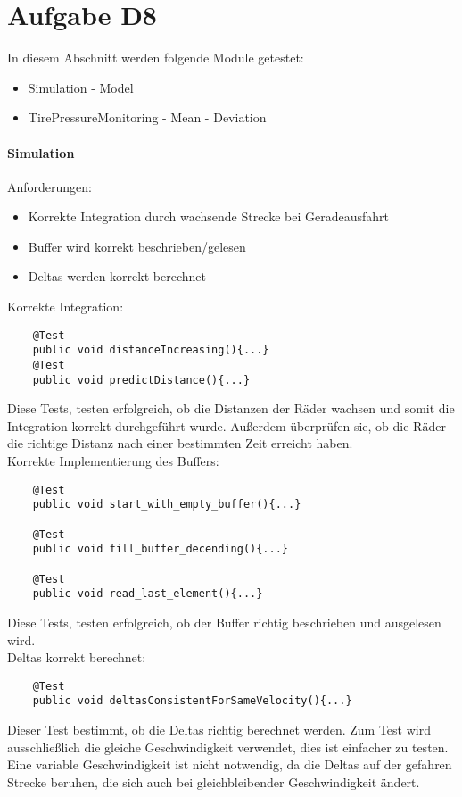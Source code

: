 
\chapter{Aufgabe D8}
In diesem Abschnitt werden folgende Module getestet:
\begin{itemize}
	\item Simulation
			\subitem - Model
	\item TirePressureMonitoring
			\subitem - Mean 
			\subitem - Deviation
\end{itemize}
\subsubsection{Simulation}
Anforderungen:
\begin{itemize}
	\item Korrekte Integration durch wachsende Strecke bei Geradeausfahrt
	\item Buffer wird korrekt beschrieben/gelesen
	\item Deltas werden korrekt berechnet
\end{itemize}
Korrekte Integration:
\begin{lstlisting}
	@Test
	public void distanceIncreasing(){...}
	@Test
	public void predictDistance(){...}
\end{lstlisting}
Diese Tests, testen erfolgreich, ob die Distanzen der Räder wachsen und somit die Integration korrekt durchgeführt wurde. Außerdem überprüfen sie, ob die Räder die richtige Distanz nach einer bestimmten Zeit erreicht haben.\\

Korrekte Implementierung des Buffers:
\begin{lstlisting}
	@Test
	public void start_with_empty_buffer(){...}
	
	@Test
	public void fill_buffer_decending(){...}
	
	@Test
	public void read_last_element(){...}
\end{lstlisting}
Diese Tests, testen erfolgreich, ob der Buffer richtig beschrieben und ausgelesen wird.\\

Deltas korrekt berechnet:
\begin{lstlisting}
	@Test
	public void deltasConsistentForSameVelocity(){...}
\end{lstlisting}
Dieser Test bestimmt, ob die Deltas richtig berechnet werden. Zum Test wird ausschließlich die gleiche Geschwindigkeit verwendet, dies ist einfacher zu testen. Eine variable Geschwindigkeit ist nicht notwendig, da die Deltas auf der gefahren Strecke beruhen, die sich auch bei gleichbleibender Geschwindigkeit ändert.

